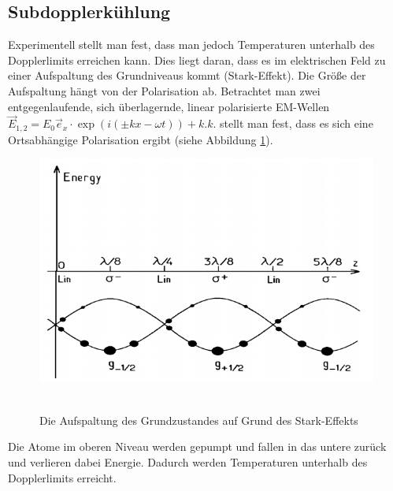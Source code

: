 \documentclass[twoside,colorback,accentcolor=tud4c,11pt]{tudreport}
\begin{document}
\subsection{Subdopplerkühlung}
Experimentell stellt man fest, dass man jedoch Temperaturen unterhalb des Dopplerlimits erreichen kann. Dies liegt daran, dass es im elektrischen Feld zu einer Aufspaltung des Grundniveaus kommt (Stark-Effekt). Die Größe der Aufspaltung hängt von der Polarisation ab. Betrachtet man zwei entgegenlaufende, sich überlagernde, linear polarisierte EM-Wellen $ \vec{E}_{1,2}=E_0\vec{e}_x\cdot \exp\left(i\left(\pm kx-\omega t\right)\right)+k.k. $ stellt man fest, dass es sich eine Ortsabhängige Polarisation ergibt (siehe Abbildung \ref{fig:subdoppler}).
\begin{figure}[H]
\centering
   	\begin{minipage}[b]{.5\textwidth}
   	\includegraphics[width=\textwidth]{graphics/subdoppler.png}\
   	\end{minipage}
\caption{Die Aufspaltung des Grundzustandes auf Grund des Stark-Effekts \cite{subdoppler}}\label{fig:subdoppler}	
\end{figure}
Die Atome im oberen Niveau werden gepumpt und fallen in das untere zurück und verlieren dabei Energie. Dadurch werden Temperaturen unterhalb des Dopplerlimits erreicht.
\end{document}
